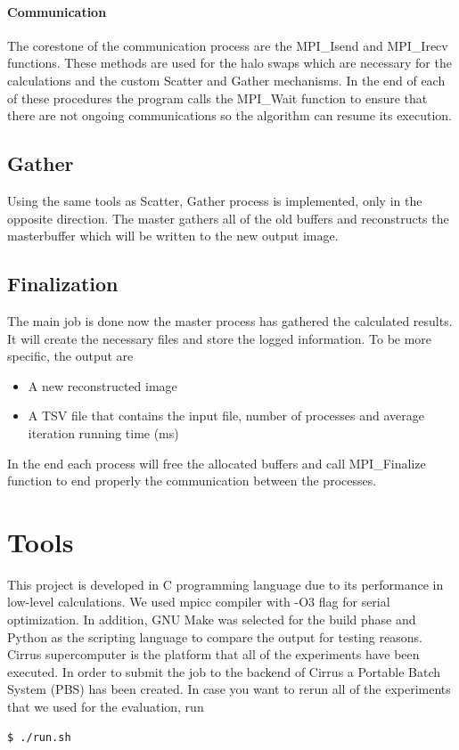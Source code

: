\documentclass[12pt,a4paper]{article}
\newcommand{\sectionVspacing}{\vspace{15pt}}
\begin{document}
        \paragraph{Communication}
            The corestone of the communication process are the MPI\_Isend and MPI\_Irecv functions. These methods are used for the halo swaps which are necessary for the calculations and the custom Scatter and Gather mechanisms. In the end of each of these procedures the program calls the MPI\_Wait function to ensure that there are not ongoing communications so the algorithm can resume its execution.

    \subsection{Gather}
    	Using the same tools as Scatter, Gather process is implemented, only in the opposite direction. The master gathers all of the old buffers and reconstructs the masterbuffer which will be written to the new output image.

    \subsection{Finalization}
    	The main job is done now the master process has gathered the calculated results. It will create the necessary files and store the logged information. To be more specific, the output are

      \begin{itemize}
		    \item A new reconstructed image
		    \item A TSV file that contains the input file, number of processes and average iteration running time (ms)
		  \end{itemize}

    	In the end each process will free the allocated buffers and call MPI\_Finalize function to end properly the communication between the processes.

\sectionVspacing
\clearpage

\section{Tools}
	This project is developed in C programming language due to its performance in low-level calculations. We used mpicc compiler with -O3 flag for serial optimization. In addition, GNU Make was selected for the build phase and Python as the scripting language to compare the output for testing reasons. Cirrus supercomputer is the platform that all of the experiments have been executed. In order to submit the job to the backend of Cirrus a Portable Batch System (PBS) has been created. In case you want to rerun all of the experiments that we used for the evaluation, run
  	\begin{lstlisting}[language=bash]
		$ ./run.sh
	\end{lstlisting}
	
\end{document}
